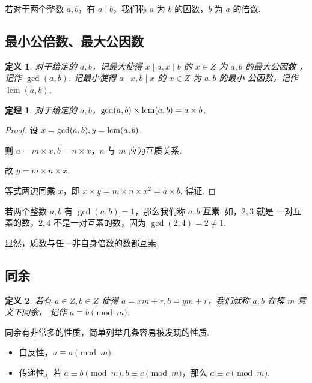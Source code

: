 \documentclass[a4paper]{article}
\newtheorem{theorem}{定理}[section]
\newtheorem{definition}{定义}[section]
\begin{document}
若对于两个整数 $a,b$，有 $a\mid b$，我们称 $a$ 为 $b$ 的因数，$b$ 为 $a$ 的倍数.

\subsection{最小公倍数、最大公因数}

\begin{definition}
    对于给定的 $a,b$，记最大使得 $x \mid a,x \mid b$ 的 $x\in Z$ 为 $a,b$ 的最大公因数
    ，记作 $\gcd(a,b)$. 记最小使得 $a\mid x,b\mid x$ 的 $x \in Z$ 为 $a,b$ 的最小
    公因数，记作 $\operatorname{lcm}(a,b)$.
\end{definition}

\begin{theorem}
    对于给定的 $a,b$，$\gcd(a,b)\times \operatornamewithlimits{lcm}(a,b)=a\times b$.
\end{theorem}

\begin{proof}
    设 $x=\gcd(a,b),y=\operatornamewithlimits{lcm}(a,b)$.

    则 $a=m\times x,b=n\times x$，$n$ 与 $m$ 应为互质关系.

    故 $y=m\times n\times x$.

    等式两边同乘 $x$，即 $x\times y=m\times n\times x^2=a\times b$. 得证.
\end{proof}

若两个整数 $a,b$ 有 $\gcd(a,b)=1$，那么我们称 $a,b$ \textbf{互素}. 如，$2,3$ 就是
一对互素的数，$2,4$ 不是一对互素的数，因为 $\gcd(2,4)=2\ne 1$.

显然，质数与任一非自身倍数的数都互素.

\subsection{同余}

\begin{definition}
    若有 $a\in Z,b\in Z$ 使得 $a=xm+r,b=ym+r$，我们就称 $a,b$ 在模 $m$ 意义下同余，
    记作 $a\equiv b \pmod m$.
\end{definition}

同余有非常多的性质，简单列举几条容易被发现的性质.

\begin{itemize}
    \item 自反性，$a\equiv a\pmod m$.
    \item 传递性，若 $a\equiv b\pmod m,b\equiv c \pmod m$，那么
          $a\equiv c\pmod m$.
\end{itemize}
\end{document}
